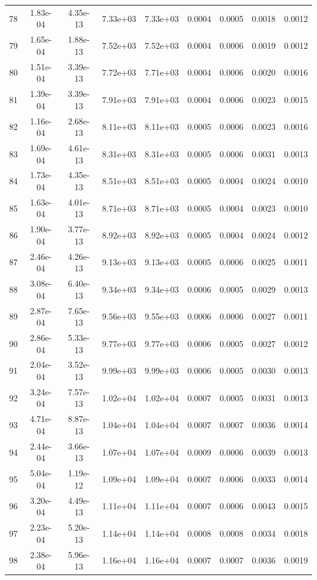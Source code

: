 \begin{longtable}{ccccccccc}
78 & 1.83e-04 & 4.35e-13 & 7.33e+03 & 7.33e+03 & 0.0004 & 0.0005 & 0.0018 & 0.0012 \\
79 & 1.65e-04 & 1.88e-13 & 7.52e+03 & 7.52e+03 & 0.0004 & 0.0006 & 0.0019 & 0.0012 \\
80 & 1.51e-04 & 3.39e-13 & 7.72e+03 & 7.71e+03 & 0.0004 & 0.0006 & 0.0020 & 0.0016 \\
81 & 1.39e-04 & 3.39e-13 & 7.91e+03 & 7.91e+03 & 0.0004 & 0.0006 & 0.0023 & 0.0015 \\
82 & 1.16e-04 & 2.68e-13 & 8.11e+03 & 8.11e+03 & 0.0005 & 0.0006 & 0.0023 & 0.0016 \\
83 & 1.69e-04 & 4.61e-13 & 8.31e+03 & 8.31e+03 & 0.0005 & 0.0006 & 0.0031 & 0.0013 \\
84 & 1.73e-04 & 4.35e-13 & 8.51e+03 & 8.51e+03 & 0.0005 & 0.0004 & 0.0024 & 0.0010 \\
85 & 1.63e-04 & 4.01e-13 & 8.71e+03 & 8.71e+03 & 0.0005 & 0.0004 & 0.0023 & 0.0010 \\
86 & 1.90e-04 & 3.77e-13 & 8.92e+03 & 8.92e+03 & 0.0005 & 0.0004 & 0.0024 & 0.0012 \\
87 & 2.46e-04 & 4.26e-13 & 9.13e+03 & 9.13e+03 & 0.0005 & 0.0006 & 0.0025 & 0.0011 \\
88 & 3.08e-04 & 6.40e-13 & 9.34e+03 & 9.34e+03 & 0.0006 & 0.0005 & 0.0029 & 0.0013 \\
89 & 2.87e-04 & 7.65e-13 & 9.56e+03 & 9.55e+03 & 0.0006 & 0.0006 & 0.0027 & 0.0011 \\
90 & 2.86e-04 & 5.33e-13 & 9.77e+03 & 9.77e+03 & 0.0006 & 0.0005 & 0.0027 & 0.0012 \\
91 & 2.04e-04 & 3.52e-13 & 9.99e+03 & 9.99e+03 & 0.0006 & 0.0005 & 0.0030 & 0.0013 \\
92 & 3.24e-04 & 7.57e-13 & 1.02e+04 & 1.02e+04 & 0.0007 & 0.0005 & 0.0031 & 0.0013 \\
93 & 4.71e-04 & 8.87e-13 & 1.04e+04 & 1.04e+04 & 0.0007 & 0.0007 & 0.0036 & 0.0014 \\
94 & 2.44e-04 & 3.66e-13 & 1.07e+04 & 1.07e+04 & 0.0009 & 0.0006 & 0.0039 & 0.0013 \\
95 & 5.04e-04 & 1.19e-12 & 1.09e+04 & 1.09e+04 & 0.0007 & 0.0006 & 0.0033 & 0.0014 \\
96 & 3.20e-04 & 4.49e-13 & 1.11e+04 & 1.11e+04 & 0.0007 & 0.0006 & 0.0043 & 0.0015 \\
97 & 2.23e-04 & 5.20e-13 & 1.14e+04 & 1.14e+04 & 0.0008 & 0.0008 & 0.0034 & 0.0018 \\
98 & 2.38e-04 & 5.96e-13 & 1.16e+04 & 1.16e+04 & 0.0007 & 0.0007 & 0.0036 & 0.0019 \\

\end{longtable}
